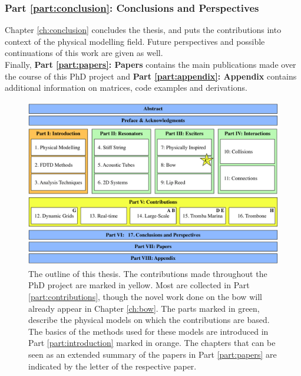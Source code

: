 \subsubsection{Part \ref{part:conclusion}: Conclusions and Perspectives}
Chapter \ref{ch:conclusion} concludes the thesis, and puts the contributions into context of the physical modelling field. Future perspectives and possible continuations of this work are given as well.
\\

\noindent Finally, \textbf{Part \ref{part:papers}: Papers} contains the main publications made over the course of this PhD project and \textbf{Part \ref{part:appendix}: Appendix} contains additional information on matrices, code examples and derivations.

\begin{figure}[h]
    \centering
    \includegraphics[width=\textwidth]{figures/intro/thesisOverview.pdf}
    \caption{\label{fig:thesisOutline} The outline of this thesis. The contributions made throughout the PhD project are marked in yellow. Most are collected in Part \ref{part:contributions}, though the novel work done on the bow will already appear in Chapter \ref{ch:bow}. The parts marked in green, describe the physical models on which the contributions are based. The basics of the methods used for these models are introduced in Part \ref{part:introduction} marked in orange. The chapters that can be seen as an extended summary of the papers in Part \ref{part:papers} are indicated by the letter of the respective paper.}
\end{figure}